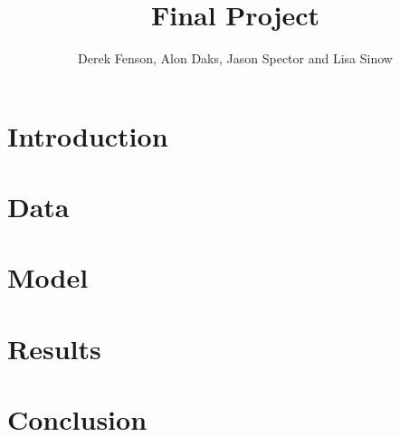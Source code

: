 \documentclass[11pt]{article}
\begin{document}
\title{Final Project}
\author{Derek Fenson, Alon Daks, Jason Spector and Lisa Sinow}
\maketitle




\section{Introduction}



\section{Data}


\section{Model}


\section{Results}


\section{Conclusion}
\end{document}
